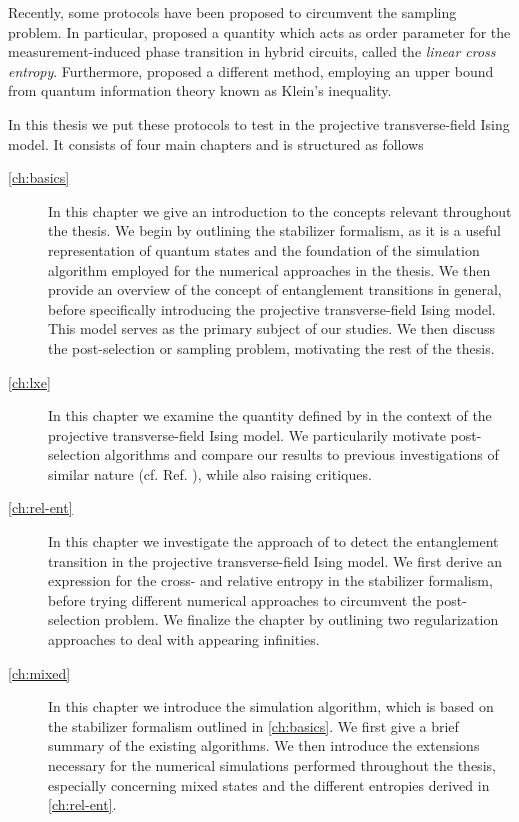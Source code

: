 Recently, some protocols have been proposed to circumvent the sampling problem.
In particular, \citeauthor{liCrossEntropyBenchmark2023} proposed a quantity
which acts as order parameter for the measurement-induced phase transition in
hybrid circuits, called the \emph{linear cross entropy}. Furthermore,
\citeauthor{garrattProbingPostmeasurementEntanglement2023} proposed a different
method, employing an upper bound from quantum information theory known as
Klein's inequality.

In this thesis we put these protocols to test in the projective
transverse-field Ising model.
It consists of four main chapters and is structured as follows
\begin{description}
  \item[\cref{ch:basics}] In this chapter we give an introduction to the
    concepts relevant throughout the thesis. We begin by outlining the
    stabilizer formalism, as it is a useful representation of quantum states
    and the foundation of the simulation algorithm employed for the numerical
    approaches in the thesis. We then provide an overview of the concept of entanglement
    transitions in general, before specifically introducing the projective
    transverse-field Ising model. This model serves as the primary subject of
    our studies. We then discuss the post-selection or sampling problem,
    motivating the rest of the thesis.
  \item[\cref{ch:lxe}] In this chapter we examine the quantity defined by
    \citeauthor{liCrossEntropyBenchmark2023} in the context of the projective
    transverse-field Ising model. We particularily motivate post-selection
    algorithms and compare our results to
    previous investigations of similar nature (cf. Ref.
    \cite{tikhanovskayaUniversalityCrossEntropy2023}), while also raising
    critiques.
  \item[\cref{ch:rel-ent}] In this chapter we investigate the approach of
    \citeauthor{garrattProbingPostmeasurementEntanglement2023} to detect the
    entanglement transition in the projective transverse-field Ising model. We
    first derive an expression for the cross- and relative entropy in the
    stabilizer formalism, before trying different numerical approaches to
    circumvent the post-selection problem. We finalize the chapter by outlining
    two regularization approaches to deal with appearing infinities.
  \item[\cref{ch:mixed}] In this chapter we introduce the simulation algorithm,
    which is based on the stabilizer formalism outlined in \cref{ch:basics}. We
    first give a brief summary of the existing algorithms. We then introduce
    the extensions necessary for the numerical simulations performed throughout
    the thesis, especially concerning mixed states and the different entropies
    derived in \cref{ch:rel-ent}.
\end{description}


